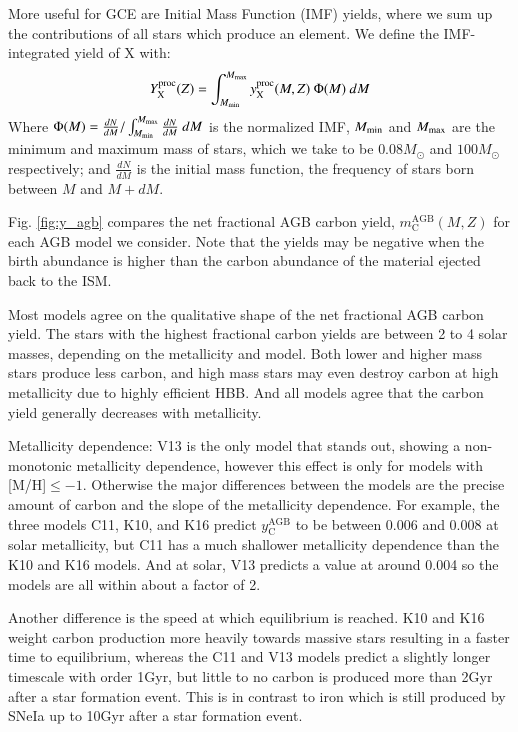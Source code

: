 \documentclass[12pt,oneside]{book}
\newcommand{\sun}{\ensuremath{\odot}}
\begin{document}
More useful for GCE are Initial Mass Function (IMF) yields, where we sum up the
contributions of all stars which produce an element.
We define the IMF-integrated yield of X with: 
\begin{equation}
Y_{\rm X}^{\rm proc}(Z) = \int_{M_{\rm min}}^{M_{\rm max}} y_{\rm X}^{\rm proc}(M, Z)\ \Phi(M)  \ dM
\end{equation}
Where $\Phi(M) = \frac{dN}{dM}/ \int_{M_{\rm min}}^{M_{\rm max}} \frac{dN}{dM}\ dM$ is the normalized IMF, $M_{\rm min}$ and $M_{\rm max}$ are the minimum and maximum mass of stars, which we take to be $0.08 M_{\sun}$ and $100 M_{\sun}$ respectively; and $\frac{dN}{dM}$ is the initial mass function, the frequency of stars born between $M$ and $M+dM$.


Fig. \ref{fig:y_agb} compares the net fractional AGB carbon yield, $m_\text{C}^\text{AGB}(M, Z)$ for each AGB model we consider. Note that the yields may be negative when the birth abundance is higher than the carbon abundance of the material ejected back to the ISM. 

Most models agree on the qualitative shape of the net fractional AGB carbon yield. The stars with the highest fractional carbon yields are between 2 to 4 solar masses, depending on the metallicity and model. Both lower and higher mass stars produce less carbon, and high mass stars may even destroy carbon at high metallicity due to highly efficient HBB. And all models agree that the carbon yield generally decreases with metallicity. 


Metallicity dependence:
V13 is the only model that stands out, showing a non-monotonic metallicity dependence, however this effect is only for models with [M/H]$\leq -1$. Otherwise the major differences between the models are the precise amount of carbon and the slope of the metallicity dependence. For example, the three models C11, K10, and K16 predict $y_\text{C}^\text{AGB}$ to be between 0.006 and 0.008 at solar metallicity, but C11 has a much shallower metallicity dependence than the K10 and K16 models. And at solar, V13 predicts a value at around 0.004 so the models are all within about a factor of 2. 

Another difference is the speed at which equilibrium is reached. K10 and K16 weight carbon production more heavily towards massive stars resulting in a faster time to equilibrium, whereas the C11 and V13 models predict a slightly longer timescale with order 1Gyr, but little to no carbon is produced more than 2Gyr after a star formation event. This is in contrast to iron which is still produced by SNeIa up to 10Gyr after a star formation event. 
\end{document}
